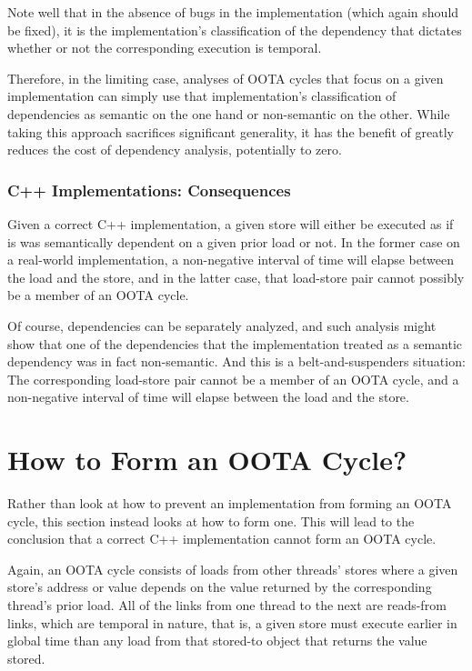 \documentclass[10]{article}
\begin{document}
Note well that in the absence of bugs in the implementation (which
again should be fixed), it is the implementation's classification of
the dependency that dictates whether or not the corresponding execution
is temporal.

Therefore, in the limiting case, analyses of OOTA cycles that focus on a
given implementation can simply use that implementation's classification
of dependencies as semantic on the one hand or non-semantic on the other.
While taking this approach sacrifices significant generality, it has the
benefit of greatly reduces the cost of dependency analysis, potentially
to zero.

\subsubsection{C++ Implementations: Consequences}
\label{sec:C++ Implementations: Consequences}

Given a correct C++ implementation, a given store will either be
executed as if is was semantically dependent on a given prior load or
not.
In the former case on a real-world implementation, a non-negative interval
of time will elapse between the load and the store, and in the latter
case, that load-store pair cannot possibly be a member of an OOTA cycle.

Of course, dependencies can be separately analyzed, and such analysis
might show that one of the dependencies that the implementation treated
as a semantic dependency was in fact non-semantic.
And this is a belt-and-suspenders situation:
The corresponding load-store pair cannot be a member of an OOTA cycle,
and a non-negative interval of time will elapse between the load and
the store.

\section{How to Form an OOTA Cycle?}
\label{sec:How to Form an OOTA Cycle?}

Rather than look at how to prevent an implementation from forming
an OOTA cycle, this section instead looks at how to form one.
This will lead to the conclusion that a correct C++ implementation
cannot form an OOTA cycle.

Again, an OOTA cycle consists of loads from other threads' stores where
a given store's address or value depends on the value returned by
the corresponding thread's prior load.
All of the links from one thread to the next are reads-from links, which
are temporal in nature, that is, a given store must execute earlier in
global time than any load from that stored-to object that returns the
value stored.
\end{document}
